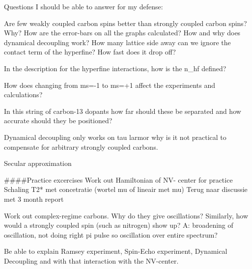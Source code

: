 Questions I should be able to answer for my defense:

Are few weakly coupled carbon spins better than strongly coupled carbon spins? Why?
How are the error-bars on all the graphs calculated?
How and why does dynamical decoupling work?
How many lattice side away can we ignore the contact term of the hyperfine? How fast does it drop off?

In the description for the hyperfine interactions, how is the n_hf defined?

How does changing from ms=-1 to ms=+1 affect the experiments and calculations?

In this string of carbon-13  dopants how far should these be separated and how accurate should they be positioned?

Dynamical decoupling only works on tau larmor
why is it not practical to compensate for arbitrary strongly coupled carbons.


Secular approximation


####Practice excercises
Work out Hamiltonian of NV- center for practice
Schaling T2* met concetratie (wortel mu of lineair met mu) Terug naar discussie met 3 month report

Work out complex-regime carbons. Why do they give oscillations?
Similarly, how would a strongly coupled spin (such as nitrogen) show up? A: broadening of oscillation, not doing right pi pulse so oscillation over entire spectrum?

Be able to explain Ramsey experiment, Spin-Echo experiment, Dynamical Decoupling and with that interaction with the NV-center.
